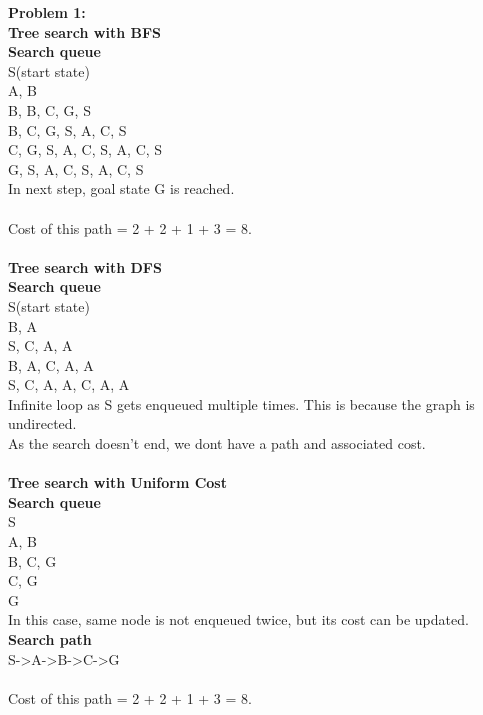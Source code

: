 

\def\semester{Vicky Prakash, Ananya Jana}
\def\course{netID: vp407, aj611}



{\bf Problem 1:}\\
{\bf Tree search with BFS}\\
{\bf Search queue}\\
S(start state)\\
A, B\\
B, B, C, G, S\\
B, C, G, S, A, C, S\\
C, G, S, A, C, S, A, C, S\\
G, S, A, C, S, A, C, S\\
In next step, goal state G is reached.\\ 
\\
Cost of this path = 2 + 2 + 1 + 3 = 8.\\ \\

{\bf Tree search with DFS}\\
{\bf Search queue}\\
S(start state)\\
B, A\\
S, C, A, A\\
B, A, C, A, A\\
S, C, A, A, C, A, A\\
Infinite loop as S gets enqueued multiple times. This is because the graph is undirected.\\
As the search doesn't end, we dont have a path and associated cost.\\\\

{\bf Tree search with Uniform Cost}\\
{\bf Search queue}\\
S\\
A, B\\
B, C, G\\
C, G\\
G\\

In this case, same node is not enqueued twice, but its cost can be updated. 
{\bf Search path}\\
S-{\textgreater }A-{\textgreater }B-{\textgreater }C-{\textgreater }G  \\\\
Cost of this path = 2 + 2 + 1 + 3 = 8.\\ \\

